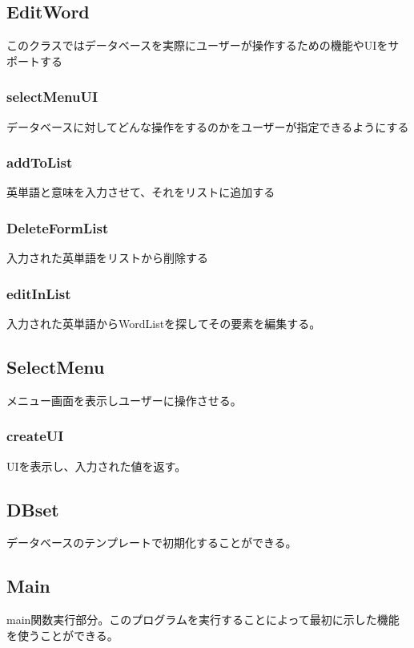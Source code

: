 \documentclass{ltjsarticle}
\begin{document}
\subsubsection{}
\subsection{EditWord}
このクラスではデータベースを実際にユーザーが操作するための機能やUIをサポートする
\subsubsection{selectMenuUI}
データベースに対してどんな操作をするのかをユーザーが指定できるようにする
\subsubsection{addToList}
英単語と意味を入力させて、それをリストに追加する
\subsubsection{DeleteFormList}
入力された英単語をリストから削除する
\subsubsection{editInList}
入力された英単語からWordListを探してその要素を編集する。


\subsection{SelectMenu}
メニュー画面を表示しユーザーに操作させる。
\subsubsection{createUI}
UIを表示し、入力された値を返す。
\subsection{DBset}
データベースのテンプレートで初期化することができる。
\subsection{Main}
main関数実行部分。このプログラムを実行することによって最初に示した機能を使うことができる。
\end{document}
